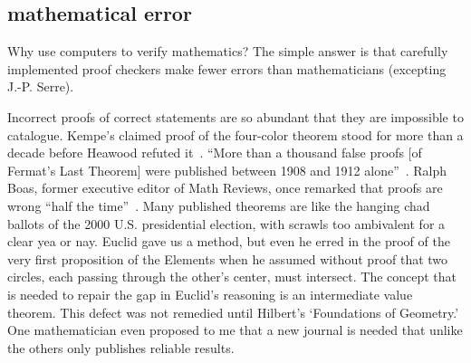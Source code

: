 \documentclass{llncs}
\begin{document}
 


\subsection{mathematical error}

Why use computers to verify mathematics?  The simple answer is that
carefully implemented proof checkers make fewer errors than 
mathematicians (excepting J.-P. Serre).

Incorrect proofs of correct statements are so abundant that they are
impossible to catalogue.  Kempe's claimed proof of the four-color
theorem stood for more than a decade before Heawood refuted
it~\cite[p.~115]{Mac}.  ``More than a thousand false proofs [of
Fermat's Last Theorem] were published between 1908 and 1912
alone''~\cite{Corry}.  Ralph Boas, former executive editor of Math
Reviews, once remarked that proofs are wrong ``half the
time''~\cite{Aus}.  Many published theorems are like the hanging chad
ballots of the 2000 U.S. presidential election, with scrawls too
ambivalent for a clear yea or nay.  Euclid gave us a method, but even
he erred in the proof of the very first proposition of the Elements
when he assumed without proof that two circles, each passing through
the other's center, must intersect.  The concept that is needed to
repair the gap in Euclid's reasoning is an intermediate value theorem.
This defect was not remedied until Hilbert's
`Foundations of Geometry.'  One mathematician even proposed to me that a
new journal is needed that unlike the others %
only publishes reliable results.

\end{document}
